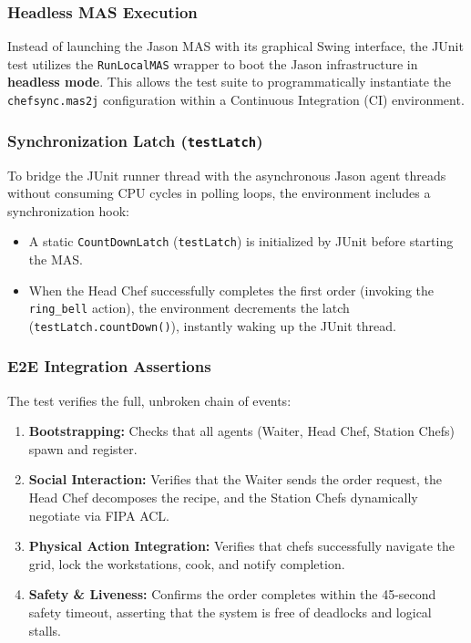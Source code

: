 \documentclass{scrartcl}
\begin{document}
\subsubsection{Headless MAS Execution}
Instead of launching the Jason MAS with its graphical Swing interface, the JUnit test utilizes the \texttt{RunLocalMAS} wrapper to boot the Jason infrastructure in \textbf{headless mode}. This allows the test suite to programmatically instantiate the \texttt{chefsync.mas2j} configuration within a Continuous Integration (CI) environment.

\subsubsection{Synchronization Latch (\texttt{testLatch})}
To bridge the JUnit runner thread with the asynchronous Jason agent threads without consuming CPU cycles in polling loops, the environment includes a synchronization hook:
\begin{itemize}
\item A static \texttt{CountDownLatch} (\texttt{testLatch}) is initialized by JUnit before starting the MAS.
\item When the Head Chef successfully completes the first order (invoking the \texttt{ring\_bell} action), the environment decrements the latch (\texttt{testLatch.countDown()}), instantly waking up the JUnit thread.
\end{itemize}

\subsubsection{E2E Integration Assertions}
The test verifies the full, unbroken chain of events:
\begin{enumerate}
\item \textbf{Bootstrapping:} Checks that all agents (Waiter, Head Chef, Station Chefs) spawn and register.
\item \textbf{Social Interaction:} Verifies that the Waiter sends the order request, the Head Chef decomposes the recipe, and the Station Chefs dynamically negotiate via FIPA ACL.
\item \textbf{Physical Action Integration:} Verifies that chefs successfully navigate the grid, lock the workstations, cook, and notify completion.
\item \textbf{Safety \& Liveness:} Confirms the order completes within the 45-second safety timeout, asserting that the system is free of deadlocks and logical stalls.
\end{enumerate}
\end{document}
